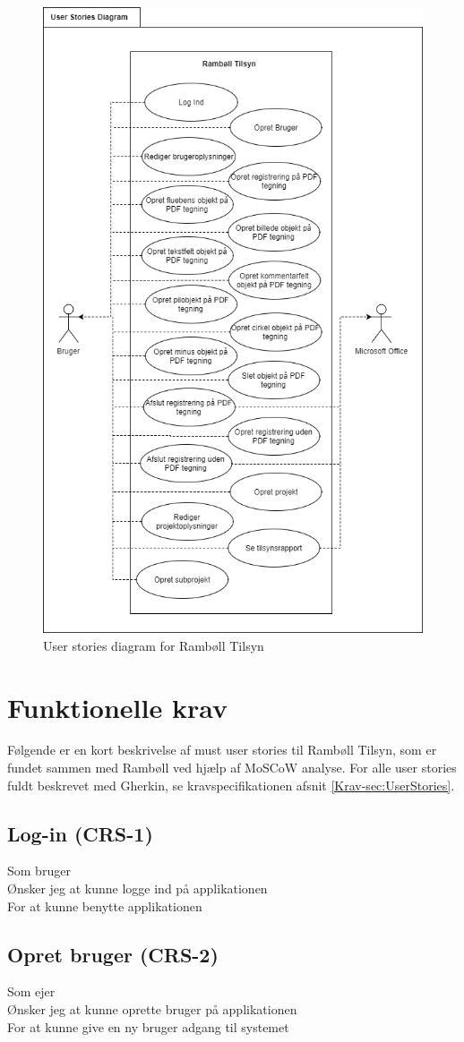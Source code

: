 	\begin{figure}[H]
		\centering
		\includegraphics[width=0.6\linewidth]{Kravspecifikation/UserStorieDiagram}
		\caption{User stories diagram for Rambøll Tilsyn}
		\label{fig:Userstoriediagram}
	\end{figure}
	
	\clearpage
	
\section{Funktionelle krav} 
	Følgende er en kort beskrivelse af must user stories til Rambøll Tilsyn, som er fundet sammen med Rambøll ved hjælp af MoSCoW analyse. \cite{MoSCoW} For alle user stories fuldt beskrevet med Gherkin, se kravspecifikationen afsnit \ref{Krav-sec:UserStories}.

	\subsection*{Log-in (CRS-1)}
	Som bruger\\
	Ønsker jeg at kunne logge ind på applikationen\\
	For at kunne benytte applikationen
	
	\subsection*{Opret bruger (CRS-2)}
	Som ejer\\
	Ønsker jeg at kunne oprette bruger på applikationen\\
	For at kunne give en ny bruger adgang til systemet
	
